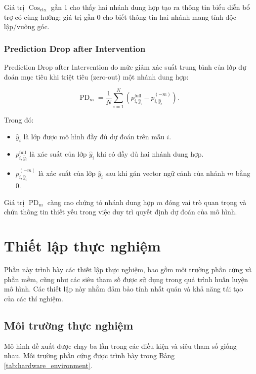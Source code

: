 Giá trị $\operatorname{Cos}_{\mathrm{ctx}}$ gần $1$ cho thấy hai nhánh dung hợp tạo ra thông tin biểu diễn bổ trợ có cùng hướng; giá trị gần $0$ cho biết thông tin hai nhánh mang tính độc lập/vuông góc.

\subsubsection{Prediction Drop after Intervention}

Prediction Drop after Intervention \cite{Hooker2019ROAR} đo mức giảm xác suất trung bình của lớp dự đoán mục tiêu khi triệt tiêu (zero-out) một nhánh dung hợp:

\begin{equation}
    \operatorname{PD}_{m} = \frac{1}{N} \sum_{i=1}^{N} \left( p_{i, \widehat{y}_i}^{\mathrm{full}} - p_{i, \widehat{y}_i}^{(-m)} \right).
    \label{eq:ch4_prediction_drop}
\end{equation}

Trong đó:
\begin{itemize}
    \item $\widehat{y}_i$ là lớp được mô hình đầy đủ dự đoán trên mẫu $i$.
    \item $p_{i, \widehat{y}_i}^{\mathrm{full}}$ là xác suất của lớp $\widehat{y}_i$ khi có đầy đủ hai nhánh dung hợp.
    \item $p_{i, \widehat{y}_i}^{(-m)}$ là xác suất của lớp $\widehat{y}_i$ sau khi gán vector ngữ cảnh của nhánh $m$ bằng 0.
\end{itemize}

Giá trị $\operatorname{PD}_m$ càng cao chứng tỏ nhánh dung hợp $m$ đóng vai trò quan trọng và chứa thông tin thiết yếu trong việc duy trì quyết định dự đoán của mô hình.

\section{Thiết lập thực nghiệm}
Phần này trình bày các thiết lập thực nghiệm, bao gồm môi trường phần cứng và phần mềm, cũng như các siêu tham số được sử dụng trong quá trình huấn luyện mô hình. Các thiết lập này nhằm đảm bảo tính nhất quán và khả năng tái tạo của các thí nghiệm.
\subsection{Môi trường thực nghiệm}
Mô hình đề xuất được chạy ba lần trong các điều kiện và siêu tham số giống nhau. Môi trường phần cứng được trình bày trong Bảng
\ref{tab:hardware_environment}.

